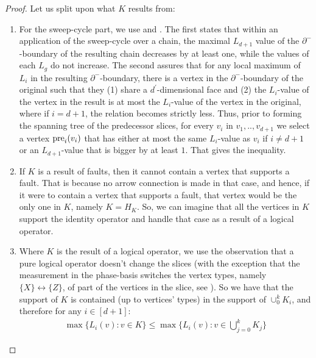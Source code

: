   \begin{proof}
 Let us split upon what $K$ results from:
    \begin{enumerate}
      \item For the sweep-cycle part, we use  and . The first states that within an application of the sweep-cycle over a chain, the maximal $L_{d+1}$ value of the $\partial^{-}$-boundary of the resulting chain decreases by at least one, while the values of each $L_{g}$ do not increase. The second assures that for any local maximum of $L_{i}$ in the resulting $\partial^{-}$-boundary, there is a vertex in the $\partial^{-}$-boundary of the original such that they (1) share a $d^{\prime}$-dimensional face and (2) the $L_{i}$-value of the vertex in the result is at most the $L_{i}$-value of the vertex in the original, where if $i=d+1$, the relation becomes strictly less. Thus, prior to forming the spanning tree of the predecessor slices, for every $v_{i}$ in $v_{1},..,v_{d+1}$ we select a vertex $\text{pre}_{i}(v_{i})$ that has either at most the same $L_{i}$-value as $v_{i}$ if $i\neq d+1$ or an $L_{d+1}$-value that is bigger by at least $1$. That gives the inequality.
        
      \item If $K$ is a result of faults, then it cannot contain a vertex that supports a fault. That is because no arrow connection is made in that case, and hence, if it were to contain a vertex that supports a fault, that vertex would be the only one in $K$, namely $K = H_{K}$. So, we can imagine that all the vertices in $K$ support the identity operator and handle that case as a result of a logical operator.
      \item Where $K$ is the result of a logical operator, we use the observation that a pure logical operator doesn't change the slices (with the exception that the measurement in the phase-basis switches the vertex types, namely $\{X\} \leftrightarrow \{Z\}$, of part of the vertices in the slice, see ). So we have that the support of $K$ is contained (up to vertices' types) in the support of $\cup_{0}^{k} K_{i}$, and therefore for any $i \in [d+1]$:
        \begin{equation*}
          \begin{split}
            \max \bigl\{ L_{i}(v) : v \in K \} \le \max \bigl\{ L_{i}(v) : v \in \bigcup_{j=0}^{k}K_{j} \} 
          \end{split}
        \end{equation*}
    \end{enumerate}
  \end{proof}

